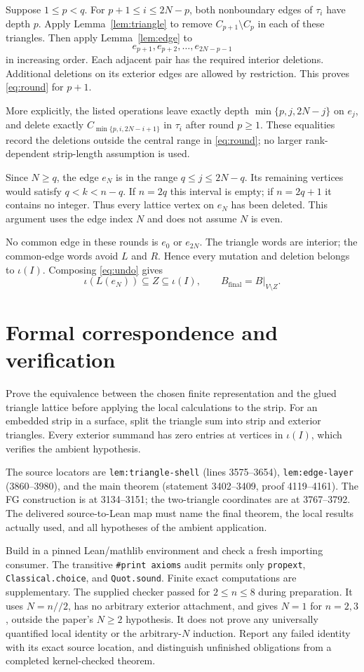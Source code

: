 \documentclass[11pt,a4paper]{article}
\begin{document}
Suppose $1\le p<q$. For $p+1\le i\le2N-p$, both nonboundary edges of
$\tau_i$ have depth $p$. Apply Lemma~\ref{lem:triangle} to remove
$C_{p+1}\setminus C_p$ in each of these triangles. Then apply
Lemma~\ref{lem:edge} to
\[
 e_{p+1},e_{p+2},\ldots,e_{2N-p-1}
\]
in increasing order. Each adjacent pair has the required interior
deletions. Additional deletions on its exterior edges are allowed by
restriction. This proves \eqref{eq:round} for $p+1$.

More explicitly, the listed operations leave exactly depth
$\min\{p,j,2N-j\}$ on $e_j$, and delete exactly
$C_{\min\{p,i,2N-i+1\}}$ in $\tau_i$ after round $p\ge1$.
These equalities record the deletions outside the central range in
\eqref{eq:round}; no larger rank-dependent strip-length assumption is used.

Since $N\ge q$, the edge $e_N$ is in the range $q\le j\le2N-q$.
Its remaining vertices would satisfy $q<k<n-q$. If $n=2q$ this interval
is empty; if $n=2q+1$ it contains no integer. Thus every lattice vertex
on $e_N$ has been deleted. This argument uses the edge index $N$ and
does not assume $N$ is even.

No common edge in these rounds is $e_0$ or $e_{2N}$.
The triangle words are interior; the common-edge words avoid $L$ and $R$.
Hence every mutation and deletion belongs to $\iota(I)$.
Composing \eqref{eq:undo} gives
\[
 \iota(L(e_N))\subseteq Z\subseteq\iota(I),\qquad
 B_{\mathrm{final}}=B|_{V\setminus Z}.
\]

\section{Formal correspondence and verification}
Prove the equivalence between the chosen finite representation and the
glued triangle lattice before applying the local calculations to the
strip. For an embedded strip in a surface, split the triangle sum into
strip and exterior triangles. Every exterior summand has zero entries
at vertices in $\iota(I)$, which verifies the ambient hypothesis.

The source locators are \texttt{lem:triangle-shell} (lines 3575--3654),
\texttt{lem:edge-layer} (3860--3980), and the main theorem
(statement 3402--3409, proof 4119--4161). The FG construction is at
3134--3151; the two-triangle coordinates are at 3767--3792.
The delivered source-to-Lean map must name the final theorem, the local
results actually used, and all hypotheses of the ambient application.

Build in a pinned Lean/mathlib environment and check a fresh importing
consumer. The transitive \texttt{\#print axioms} audit permits only
\texttt{propext}, \texttt{Classical.choice}, and \texttt{Quot.sound}.
Finite exact computations are supplementary. The supplied checker passed
for $2\le n\le8$ during preparation. It uses
$N=n\mathbin{//}2$, has no arbitrary exterior attachment, and gives
$N=1$ for $n=2,3$, outside the paper's $N\ge2$ hypothesis.
It does not prove any universally quantified local identity or the
arbitrary-$N$ induction. Report any failed identity with its exact
source location, and distinguish unfinished obligations from a completed
kernel-checked theorem.
\end{document}
